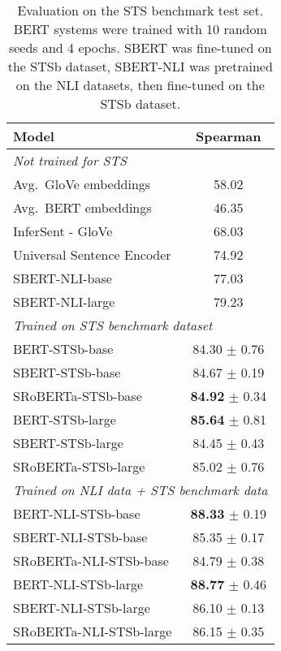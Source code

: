 \documentclass[11pt,a4paper]{article}
\begin{document}
\begin{table}[h]
	\centering 
	\footnotesize
	\begin{tabular}{|l|c|}
		\hline
		\textbf{Model} & \textbf{Spearman} \\ \hline
		\multicolumn{2}{|l|}{\textit{Not trained for STS}} \\ \hline
		Avg.\ GloVe embeddings & 58.02\\
		Avg.\ BERT embeddings &  46.35\\
		InferSent - GloVe &  68.03 \\
		Universal Sentence Encoder &  74.92\\
		SBERT-NLI-base  &  77.03\\
		SBERT-NLI-large & 79.23 \\ \hline 
		\multicolumn{2}{|l|}{\textit{Trained on STS benchmark dataset}} \\ \hline
		BERT-STSb-base & 84.30 $\pm$ 0.76  \\
		SBERT-STSb-base & 84.67 $\pm$ 0.19 \\ 
		SRoBERTa-STSb-base & \textbf{84.92} $\pm$ 0.34 \\ \hline 
		
		BERT-STSb-large  & \textbf{85.64} $\pm$ 0.81 \\ 
		SBERT-STSb-large & 84.45 $\pm$ 0.43 \\ 
		SRoBERTa-STSb-large & 85.02 $\pm$ 0.76 \\ \hline 
		
		\multicolumn{2}{|l|}{\textit{Trained on NLI data + STS benchmark data}} \\ \hline
		
		BERT-NLI-STSb-base & \textbf{88.33} $\pm$ 0.19 \\ 
		SBERT-NLI-STSb-base & 85.35 $\pm$ 0.17 \\ 
		SRoBERTa-NLI-STSb-base & 84.79 $\pm$ 0.38 \\ \hline
		
		BERT-NLI-STSb-large & \textbf{88.77} $\pm$ 0.46 \\ 
		SBERT-NLI-STSb-large & 86.10 $\pm$ 0.13  \\
		SRoBERTa-NLI-STSb-large & 86.15 $\pm$ 0.35 \\ \hline 
	\end{tabular}
	\caption{Evaluation on the STS benchmark test set. BERT systems were trained with 10 random seeds and 4 epochs. SBERT was fine-tuned on the STSb dataset, SBERT-NLI was pretrained on the NLI datasets, then fine-tuned on the STSb dataset. }
	\label{table_stsb}
\end{table}
\end{document}
